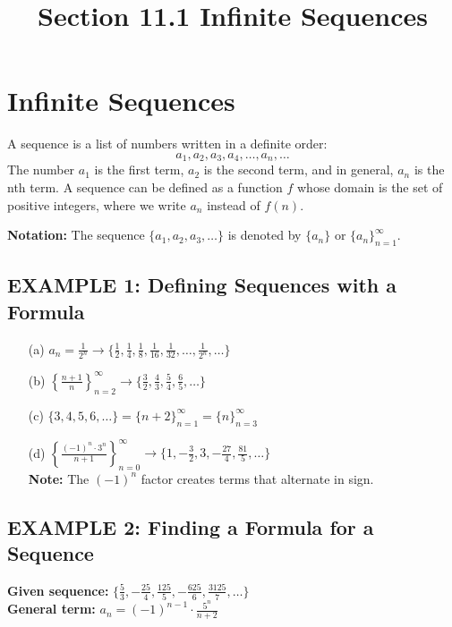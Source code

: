 \documentclass{article}
\title{Section 11.1 Infinite Sequences}
\date{}
\author{}
\begin{document}
\maketitle

\section*{Infinite Sequences}
A sequence is a list of numbers written in a definite order:
\[ a_1, a_2, a_3, a_4, \dots, a_n, \dots \]
The number \(a_1\) is the first term, \(a_2\) is the second term, and in general, \(a_n\) is the nth term. A sequence can be defined as a function \(f\) whose domain is the set of positive integers, where we write \(a_n\) instead of \(f(n)\).

\noindent
\textbf{Notation:} The sequence $\{a_1, a_2, a_3, \dots\}$ is denoted by $\{a_n\}$ or $\{a_n\}_{n=1}^{\infty}$.

\subsection*{EXAMPLE 1: Defining Sequences with a Formula}
\begin{itemize}
    \item[(a)] \( a_n = \frac{1}{2^n} \rightarrow \{\frac{1}{2}, \frac{1}{4}, \frac{1}{8}, \frac{1}{16}, \frac{1}{32}, \dots, \frac{1}{2^n}, \dots\} \)
    \item[(b)] \( \left\{ \frac{n+1}{n} \right\}_{n=2}^{\infty} \rightarrow \{\frac{3}{2}, \frac{4}{3}, \frac{5}{4}, \frac{6}{5}, \dots\} \)
    \item[(c)] \( \{3, 4, 5, 6, \dots\} = \{n+2\}_{n=1}^{\infty} = \{n\}_{n=3}^{\infty} \)
    \item[(d)] \( \left\{ \frac{(-1)^n \cdot 3^n}{n+1} \right\}_{n=0}^{\infty} \rightarrow \{1, -\frac{3}{2}, 3, -\frac{27}{4}, \frac{81}{5}, \dots\} \) \\
    \textbf{Note:} The \((-1)^n\) factor creates terms that alternate in sign.
\end{itemize}

\subsection*{EXAMPLE 2: Finding a Formula for a Sequence}
\textbf{Given sequence:} \( \{\frac{5}{3}, -\frac{25}{4}, \frac{125}{5}, -\frac{625}{6}, \frac{3125}{7}, \dots\} \) \\
\textbf{General term:} \( a_n = (-1)^{n-1} \cdot \frac{5^n}{n+2} \)
\end{document}
